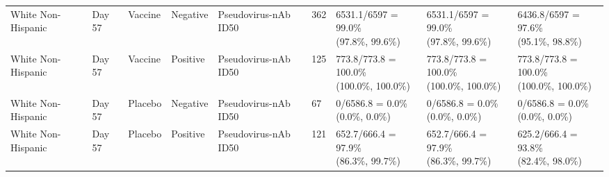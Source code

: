 \documentclass[]{book}
\theoremstyle{definition}
\theoremstyle{definition}
\theoremstyle{definition}
\newcommand{\1}{\mathbbm{1}}
\begin{document}
\begin{landscape}
\begin{ThreePartTable}
\begin{longtable}[t]{>{\raggedright\arraybackslash}p{2.7cm}llllllll}
\hspace{1em}White Non-Hispanic & Day 57 & Vaccine & Negative & Pseudovirus-nAb ID50 & 362 & \makecell[l]{6531.1/6597 = 99.0\%\\(97.8\%, 99.6\%)} & \makecell[l]{6531.1/6597 = 99.0\%\\(97.8\%, 99.6\%)} & \makecell[l]{6436.8/6597 = 97.6\%\\(95.1\%, 98.8\%)}\\
\hspace{1em}White Non-Hispanic & Day 57 & Vaccine & Positive & Pseudovirus-nAb ID50 & 125 & \makecell[l]{773.8/773.8 = 100.0\%\\(100.0\%, 100.0\%)} & \makecell[l]{773.8/773.8 = 100.0\%\\(100.0\%, 100.0\%)} & \makecell[l]{773.8/773.8 = 100.0\%\\(100.0\%, 100.0\%)}\\
\hspace{1em}White Non-Hispanic & Day 57 & Placebo & Negative & Pseudovirus-nAb ID50 & 67 & \makecell[l]{0/6586.8 = 0.0\%\\(0.0\%, 0.0\%)} & \makecell[l]{0/6586.8 = 0.0\%\\(0.0\%, 0.0\%)} & \makecell[l]{0/6586.8 = 0.0\%\\(0.0\%, 0.0\%)}\\
\hspace{1em}White Non-Hispanic & Day 57 & Placebo & Positive & Pseudovirus-nAb ID50 & 121 & \makecell[l]{652.7/666.4 = 97.9\%\\(86.3\%, 99.7\%)} & \makecell[l]{652.7/666.4 = 97.9\%\\(86.3\%, 99.7\%)} & \makecell[l]{625.2/666.4 = 93.8\%\\(82.4\%, 98.0\%)}\\*
\end{longtable}
\end{ThreePartTable}


\clearpage


\end{landscape}
\end{document}
